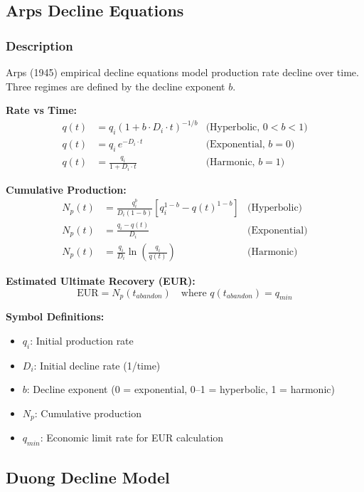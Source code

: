 \documentclass[11pt,a4paper]{article}
\newcommand{\symitem}[2]{\item \textbf{#1}: #2}
\begin{document}
\subsection{Arps Decline Equations}

\subsubsection{Description}
Arps (1945) empirical decline equations model production rate decline over time. Three regimes are defined by the decline exponent $b$.

\begin{tcolorbox}[colback=formulabox,colframe=black!75]
\textbf{Rate vs Time:}
\begin{align}
q(t) &= q_i (1 + b \cdot D_i \cdot t)^{-1/b} & \text{(Hyperbolic, } 0 < b < 1\text{)} \\
q(t) &= q_i \, e^{-D_i \cdot t} & \text{(Exponential, } b = 0\text{)} \\
q(t) &= \frac{q_i}{1 + D_i \cdot t} & \text{(Harmonic, } b = 1\text{)}
\end{align}

\textbf{Cumulative Production:}
\begin{align}
N_p(t) &= \frac{q_i^b}{D_i (1-b)} \left[ q_i^{1-b} - q(t)^{1-b} \right] & \text{(Hyperbolic)} \\
N_p(t) &= \frac{q_i - q(t)}{D_i} & \text{(Exponential)} \\
N_p(t) &= \frac{q_i}{D_i} \ln\left(\frac{q_i}{q(t)}\right) & \text{(Harmonic)}
\end{align}

\textbf{Estimated Ultimate Recovery (EUR):}
\begin{equation}
\text{EUR} = N_p(t_{abandon}) \quad \text{where } q(t_{abandon}) = q_{min}
\end{equation}
\end{tcolorbox}

\textbf{Symbol Definitions:}
\begin{itemize}[leftmargin=2cm]
\symitem{$q_i$}{Initial production rate}
\symitem{$D_i$}{Initial decline rate (1/time)}
\symitem{$b$}{Decline exponent (0 = exponential, 0--1 = hyperbolic, 1 = harmonic)}
\symitem{$N_p$}{Cumulative production}
\symitem{$q_{min}$}{Economic limit rate for EUR calculation}
\end{itemize}

\subsection{Duong Decline Model}
\end{document}
